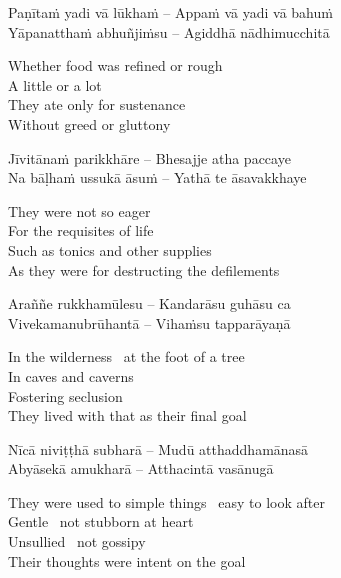 \begin{twochants}
  Paṇītaṁ yadi vā lūkhaṁ – Appaṁ vā yadi vā bahuṁ\\
  Yāpanatthaṁ abhuñjiṁsu – Agiddhā nādhimucchitā\\
\end{twochants}

\begin{english}
  Whether food was refined or rough\\
  A little or a lot\\
  They ate only for sustenance\\
  Without greed or gluttony
\end{english}

\begin{twochants}
  Jīvitānaṁ parikkhāre – Bhesajje atha paccaye\\
  Na bāḷhaṁ ussukā āsuṁ – Yathā te āsavakkhaye\\
\end{twochants}

\begin{english}
  They were not so eager\\
  For the requisites of life\\
  Such as tonics and other supplies\\
  As they were for destructing the defilements
\end{english}

\begin{twochants}
  Araññe rukkhamūlesu – Kandarāsu guhāsu ca\\
  Vivekamanubrūhantā – Vihaṁsu tapparāyaṇā\\
\end{twochants}

\begin{english}
  In the wilderness \breathmark\ at the foot of a tree\\
  In caves and caverns\\
  Fostering seclusion\\
  They lived with that as their final goal
\end{english}

\begin{twochants}
  Nīcā niviṭṭhā subharā – Mudū atthaddhamānasā\\
  Abyāsekā amukharā – Atthacintā vasānugā\\
\end{twochants}

\begin{english}
  They were used to simple things \breathmark\ easy to look after\\
  Gentle \breathmark\ not stubborn at heart\\
  Unsullied \breathmark\ not gossipy\\
  Their thoughts were intent on the goal
\end{english}

